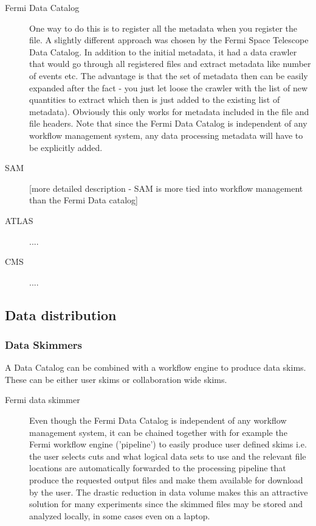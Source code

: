 \begin{description}
\item[Fermi Data Catalog] One way to do this is to register all the metadata when you register the file. A slightly
different approach was chosen by the Fermi Space Telescope Data Catalog. In addition to the initial metadata, it had a
data crawler that would go through all registered files and extract metadata like number of events etc. The advantage is
that the set of metadata then can be easily expanded after the fact - you just let loose the crawler with the list
of new quantities to extract which then is just added to the existing list of metadata). Obviously this only works for 
metadata included in the file and file headers.  Note that since the Fermi 
Data Catalog is independent of any workflow management system, any data processing metadata will have to be explicitly added. 


\item[SAM] [more detailed description - SAM is more tied into workflow management than the Fermi Data catalog]

\item[ATLAS] ....

\item[CMS] ....

\end{description}



\subsection{Data distribution}

\subsubsection{Data Skimmers}
A Data Catalog can be combined with a workflow engine to produce data skims. These can be either user skims or collaboration 
wide skims. 

\begin{description}
\item[Fermi data skimmer] Even though the Fermi Data Catalog is independent of any workflow management system, it 
can be chained together with for example the Fermi workflow engine ('pipeline') to easily produce user defined skims 
i.e. the user selects cuts and what logical data sets to use and the relevant file locations are automatically 
forwarded to the processing pipeline that produce the requested output files and make them available for download 
by the user. The drastic reduction in data volume makes this an attractive solution for many experiments since the skimmed files 
may be stored and analyzed locally, in some cases even on a laptop.
\end{description}

